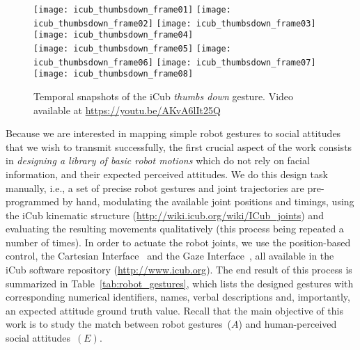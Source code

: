 \begin{figure}
\centering
\subfloat
{\texttt{[image: icub\_thumbsdown\_frame01]}} \quad
%
\subfloat
{\texttt{[image: icub\_thumbsdown\_frame02]}} \quad
%
\subfloat
{\texttt{[image: icub\_thumbsdown\_frame03]}} \quad
%
\subfloat
{\texttt{[image: icub\_thumbsdown\_frame04]}} \\
%
\subfloat
{\texttt{[image: icub\_thumbsdown\_frame05]}} \quad
%
\subfloat
{\texttt{[image: icub\_thumbsdown\_frame06]}} \quad
%
\subfloat
{\texttt{[image: icub\_thumbsdown\_frame07]}} \quad
%
\subfloat
{\texttt{[image: icub\_thumbsdown\_frame08]}}
\caption[Temporal snapshots of the iCub \emph{thumbs down} gesture.]{Temporal snapshots of the iCub \emph{thumbs down} gesture. Video available at \url{https://youtu.be/AKvA6lIt25Q}}
\label{fig:thumbsdown}
\end{figure}

Because we are interested in mapping simple robot gestures to social attitudes that we wish to transmit successfully, the first crucial aspect of the work consists in \emph{designing a library of basic robot motions} which do not rely on facial information, and their expected perceived attitudes.
We do this design task manually, i.e., a set of precise robot gestures and joint trajectories are pre-programmed by hand, modulating the available joint positions and timings, using the iCub kinematic structure (\url{http://wiki.icub.org/wiki/ICub_joints}) and evaluating the resulting movements qualitatively (this process being repeated a number of times).
In order to actuate the robot joints, we use the position-based control, the Cartesian Interface~\cite{pattacini:2010:iros} and the Gaze Interface~\cite{roncone:2016:rss}, all available in the iCub software repository (\url{http://www.icub.org}).
The end result of this process is summarized in Table~\ref{tab:robot_gestures}, which lists the designed gestures with corresponding numerical identifiers, names, verbal descriptions and, importantly, an expected attitude ground truth value.
Recall that the main objective of this work is to study the match between robot gestures~($A$) and human-perceived social attitudes~$(E)$.

